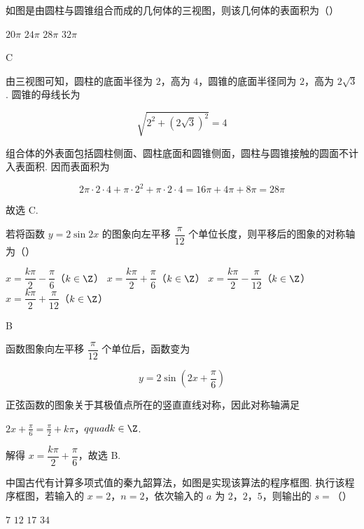 \begin{problem}
如图是由圆柱与圆锥组合而成的几何体的三视图，则该几何体的表面积为（\quad）

\begingroup
{}
\endgroup

\choices
    {\(20\pi\)}
    {\(24\pi\)}
    {\(28\pi\)}
    {\(32\pi\)}
\end{problem}

\begin{answer}
C
\end{answer}

\begin{solution}
由三视图可知，圆柱的底面半径为 \(2\)，高为 \(4\)，圆锥的底面半径同为 \(2\)，高为 \(2\sqrt3\). 圆锥的母线长为

\[
\sqrt{2^2+(2\sqrt3)^2}=4
\]

组合体的外表面包括圆柱侧面、圆柱底面和圆锥侧面，圆柱与圆锥接触的圆面不计入表面积. 因而表面积为

\[
2\pi\cdot2\cdot4+\pi\cdot2^2+\pi\cdot2\cdot4=16\pi+4\pi+8\pi=28\pi
\]

故选 C.
\end{solution}

\begin{problem}
若将函数 \(y=2\sin2x\) 的图象向左平移 \(\dfrac{\pi}{12}\) 个单位长度，则平移后的图象的对称轴为（\quad）

\choices
    {\(x=\dfrac{k\pi}{2}-\dfrac{\pi}{6}\)（\(k\in\Z\)）}
    {\(x=\dfrac{k\pi}{2}+\dfrac{\pi}{6}\)（\(k\in\Z\)）}
    {\(x=\dfrac{k\pi}{2}-\dfrac{\pi}{12}\)（\(k\in\Z\)）}
    {\(x=\dfrac{k\pi}{2}+\dfrac{\pi}{12}\)（\(k\in\Z\)）}
\end{problem}

\begin{answer}
B
\end{answer}

\begin{solution}
函数图象向左平移 \(\dfrac\pi{12}\) 个单位后，函数变为

\[
y=2\sin\left(2x+\frac\pi6\right)
\]

正弦函数的图象关于其极值点所在的竖直直线对称，因此对称轴满足

\(2x+\frac\pi6=\frac\pi2+k\pi\)，\(qquad k\in\Z\).

解得 \(x=\dfrac{k\pi}{2}+\dfrac\pi6\)，故选 B.
\end{solution}

\begin{problem}
中国古代有计算多项式值的秦九韶算法，如图是实现该算法的程序框图. 执行该程序框图，若输入的 \(x=2\)，\(n=2\)，依次输入的 \(a\) 为 \(2\)，\(2\)，\(5\)，则输出的 \(s=\)（\quad）

\begingroup
{}
\endgroup

\choices
    {\(7\)}
    {\(12\)}
    {\(17\)}
    {\(34\)}
\end{problem}

